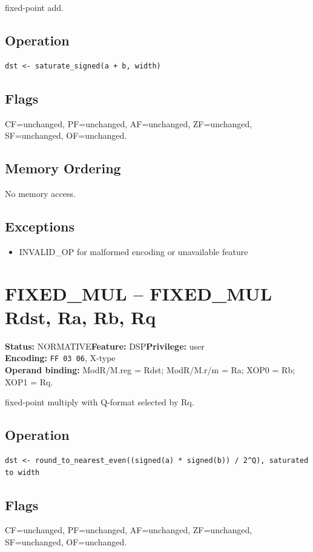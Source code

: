 \documentclass[10pt]{article}
\begin{document}
fixed-point add.

\subsection*{Operation}
\begin{lstlisting}
dst <- saturate_signed(a + b, width)
\end{lstlisting}
\subsection*{Flags}
CF=unchanged, PF=unchanged, AF=unchanged, ZF=unchanged, SF=unchanged, OF=unchanged.
\subsection*{Memory Ordering}
No memory access.
\subsection*{Exceptions}
\begin{itemize}
\item INVALID\_OP for malformed encoding or unavailable feature
\end{itemize}
\clearpage

\section{FIXED\_MUL -- FIXED\_MUL Rdst, Ra, Rb, Rq}
\textbf{Status:} NORMATIVE\quad \textbf{Feature:} DSP\quad \textbf{Privilege:} user\\
\textbf{Encoding:} \texttt{FF 03 06}, X-type\\
\textbf{Operand binding:} ModR/M.reg = Rdst; ModR/M.r/m = Ra; XOP0 = Rb; XOP1 = Rq.

fixed-point multiply with Q-format selected by Rq.

\subsection*{Operation}
\begin{lstlisting}
dst <- round_to_nearest_even((signed(a) * signed(b)) / 2^Q), saturated to width
\end{lstlisting}
\subsection*{Flags}
CF=unchanged, PF=unchanged, AF=unchanged, ZF=unchanged, SF=unchanged, OF=unchanged.
\end{document}
